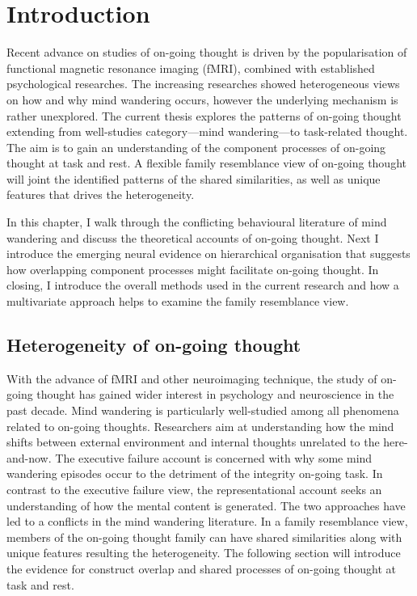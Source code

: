 \chapter{Introduction}
\label{ch:intro}


Recent advance on studies of on-going thought is driven by the popularisation of functional magnetic resonance imaging (fMRI), combined with established psychological researches. The increasing researches showed heterogeneous views on how and why mind wandering occurs, however the underlying mechanism is rather unexplored. The current thesis explores the patterns of on-going thought extending from well-studies category---mind wandering---to task-related thought. The aim is to gain an understanding of the component processes of on-going thought at task and rest. A flexible family resemblance view \cite{Seli2018} of on-going thought will joint the identified patterns of the shared similarities, as well as unique features that drives the heterogeneity.

In this chapter, I walk through the conflicting behavioural literature of mind wandering and discuss the theoretical accounts of on-going thought. Next I introduce the emerging neural evidence on hierarchical organisation that suggests how overlapping component processes might facilitate on-going thought. In closing, I introduce the overall methods used in the current research and how a multivariate approach helps to examine the family resemblance view.

\section{Heterogeneity of on-going thought}
\label{ch:intro:heterogeneity}


With the advance of fMRI and other neuroimaging technique, the study of on-going thought has gained wider interest in psychology and neuroscience in the past decade. Mind wandering is particularly well-studied among all phenomena related to on-going thoughts. Researchers aim at understanding how the mind shifts between external environment and internal thoughts unrelated to the here-and-now. 
The executive failure account is concerned with why some mind wandering episodes occur to the detriment of the integrity on-going task. In contrast to the executive failure view, the representational account seeks an understanding of how the mental content is generated. The two approaches have led to a conflicts in the mind wandering literature. In a family resemblance view, members of the on-going thought family can have shared similarities along with unique features resulting the heterogeneity. The following section will introduce the evidence for construct overlap and shared processes of on-going thought at task and rest.

